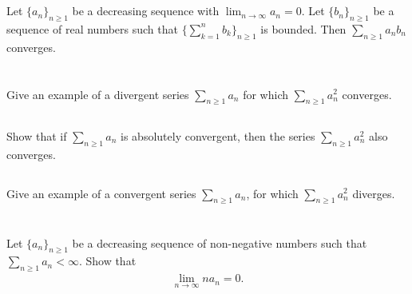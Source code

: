 \documentclass[11pt,letterpaper]{article}
\begin{document}
\section{}
Let $\{a_n\}_{n\geq 1}$ be a decreasing sequence with $\lim_{n\to\infty} a_n=0$. Let $\{b_n\}_{n\geq 1}$ be a sequence of real numbers such that $\{\sum_{k=1}^n b_k\}_{n\geq 1}$ is bounded. Then $\sum_{n\geq 1} a_nb_n$ converges.

\section{}
\subsection{}
Give an example of a divergent series $\sum_{n\geq 1} a_n$ for which $\sum_{n\geq 1} a_n^2$ converges.

\subsection{}
Show that if $\sum_{n\geq 1} a_n$ is absolutely convergent, then the series $\sum_{n\geq 1} a_n^2$ also converges.

\subsection{}
Give an example of a convergent series $\sum_{n\geq 1} a_n$, for which $\sum_{n\geq 1} a_n^2$ diverges.

\section{}
Let $\{a_n\}_{n\geq 1}$ be a decreasing sequence of non-negative numbers such
that $\sum_{n\geq 1} a_n<\infty$. Show that
\begin{align}
    \lim_{n\to\infty} na_n = 0.
\end{align}


\end{document}
